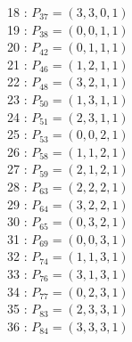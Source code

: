 \documentclass{article}
\begin{document}
{\begin{multicols}{3}
18 : $P_{37}=( 3, 3, 0, 1 )$\\
19 : $P_{38}=( 0, 0, 1, 1 )$\\
20 : $P_{42}=( 0, 1, 1, 1 )$\\
21 : $P_{46}=( 1, 2, 1, 1 )$\\
22 : $P_{48}=( 3, 2, 1, 1 )$\\
23 : $P_{50}=( 1, 3, 1, 1 )$\\
24 : $P_{51}=( 2, 3, 1, 1 )$\\
25 : $P_{53}=( 0, 0, 2, 1 )$\\
26 : $P_{58}=( 1, 1, 2, 1 )$\\
27 : $P_{59}=( 2, 1, 2, 1 )$\\
28 : $P_{63}=( 2, 2, 2, 1 )$\\
29 : $P_{64}=( 3, 2, 2, 1 )$\\
30 : $P_{65}=( 0, 3, 2, 1 )$\\
31 : $P_{69}=( 0, 0, 3, 1 )$\\
32 : $P_{74}=( 1, 1, 3, 1 )$\\
33 : $P_{76}=( 3, 1, 3, 1 )$\\
34 : $P_{77}=( 0, 2, 3, 1 )$\\
35 : $P_{83}=( 2, 3, 3, 1 )$\\
36 : $P_{84}=( 3, 3, 3, 1 )$\\
\end{multicols}


%


%


}%
\end{document}

